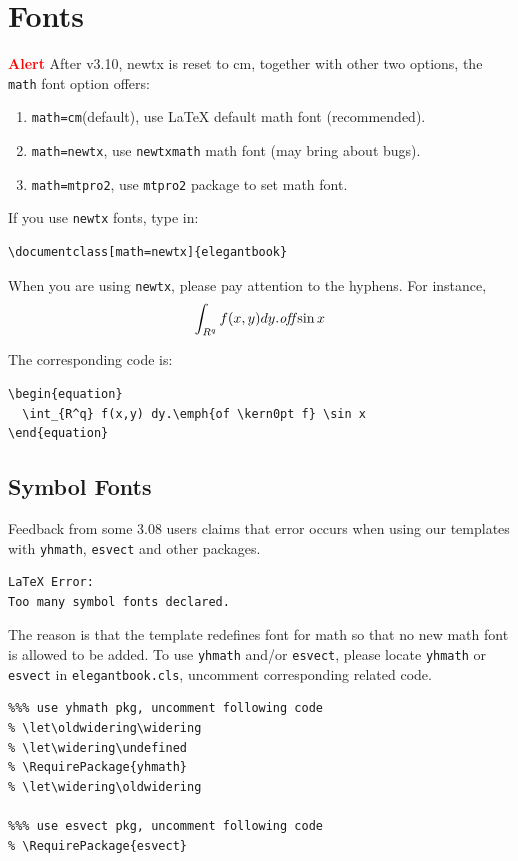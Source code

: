 \documentclass[11pt,bibtex]{elegantbook}
\begin{document}
\section{Fonts}
\textcolor{red}{\bfseries Alert} After v3.10, newtx is reset to cm, together with other two options, the \lstinline{math} font option offers:
\begin{enumerate}
  \item \lstinline{math=cm}(default), use \LaTeX{} default math font (recommended).
  \item \lstinline{math=newtx}, use \lstinline{newtxmath} math font (may bring about bugs).
  \item \lstinline{math=mtpro2}, use \lstinline{mtpro2} package to set math font.
\end{enumerate}

If you use \lstinline{newtx} fonts, type in:
\begin{lstlisting}
\documentclass[math=newtx]{elegantbook}
\end{lstlisting}

When you are using \lstinline{newtx}, please pay attention to the hyphens. For instance,
\begin{equation}
\int_{R^q} f(x,y) dy.\emph{of\kern0pt f} \sin x
\end{equation}

The corresponding code is:
\begin{lstlisting}
\begin{equation}
  \int_{R^q} f(x,y) dy.\emph{of \kern0pt f} \sin x
\end{equation}
\end{lstlisting}

\subsection{Symbol Fonts}
Feedback from some 3.08 users claims that error occurs when using our templates with  \lstinline{yhmath}, \lstinline{esvect} and other packages.
\begin{lstlisting}
LaTeX Error:
Too many symbol fonts declared.
\end{lstlisting}

The reason is that the template redefines font for math so that no new math font is allowed to be added. To use \lstinline{yhmath} and/or \lstinline{esvect}, please locate \lstinline{yhmath} or \lstinline{esvect} in \lstinline{elegantbook.cls}, uncomment corresponding related code.

\begin{lstlisting}
%%% use yhmath pkg, uncomment following code
% \let\oldwidering\widering
% \let\widering\undefined
% \RequirePackage{yhmath}
% \let\widering\oldwidering

%%% use esvect pkg, uncomment following code
% \RequirePackage{esvect}
\end{lstlisting}
\end{document}
